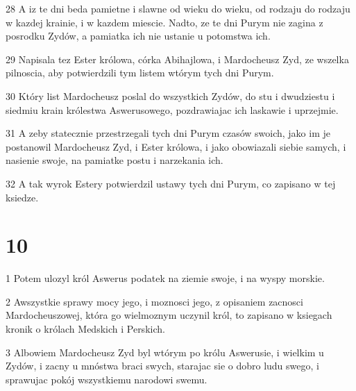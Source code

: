 \par 28 A iz te dni beda pamietne i slawne od wieku do wieku, od rodzaju do rodzaju w kazdej krainie, i w kazdem miescie. Nadto, ze te dni Purym nie zagina z posrodku Zydów, a pamiatka ich nie ustanie u potomstwa ich.
\par 29 Napisala tez Ester królowa, córka Abihajlowa, i Mardocheusz Zyd, ze wszelka pilnoscia, aby potwierdzili tym listem wtórym tych dni Purym.
\par 30 Który list Mardocheusz poslal do wszystkich Zydów, do stu i dwudziestu i siedmiu krain królestwa Aswerusowego, pozdrawiajac ich laskawie i uprzejmie.
\par 31 A zeby statecznie przestrzegali tych dni Purym czasów swoich, jako im je postanowil Mardocheusz Zyd, i Ester królowa, i jako obowiazali siebie samych, i nasienie swoje, na pamiatke postu i narzekania ich.
\par 32 A tak wyrok Estery potwierdzil ustawy tych dni Purym, co zapisano w tej ksiedze.

\chapter{10}

\par 1 Potem ulozyl król Aswerus podatek na ziemie swoje, i na wyspy morskie.
\par 2 Awszystkie sprawy mocy jego, i moznosci jego, z opisaniem zacnosci Mardocheuszowej, która go wielmoznym uczynil król, to zapisano w ksiegach kronik o królach Medskich i Perskich.
\par 3 Albowiem Mardocheusz Zyd byl wtórym po królu Aswerusie, i wielkim u Zydów, i zacny u mnóstwa braci swych, starajac sie o dobro ludu swego, i sprawujac pokój wszystkiemu narodowi swemu.


